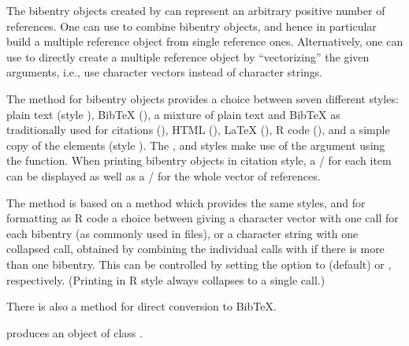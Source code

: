 \begin{Details}\relax
The bibentry objects created by  can represent an
arbitrary positive number of references.  One can use  to
combine bibentry objects, and hence in particular build a multiple
reference object from single reference ones.  Alternatively, one can
use  to directly create a multiple reference object by
``vectorizing'' the given arguments, i.e., use character vectors
instead of character strings.

The  method for bibentry objects provides a choice
between seven different styles:
plain text (style ),
BibTeX (),
a mixture of plain text and BibTeX as traditionally used for citations
(),
HTML (),
LaTeX (),
R code (),
and a simple copy of the  elements (style
).
The ,  and  styles make use
of the  argument using the 
function.  When printing bibentry objects in citation style, a
/ for each item can be displayed as well as
a / for the whole vector of references.

The  method is based on a 
method which provides the same styles, and for formatting as R code
a choice between giving a character vector with one 
call for each bibentry (as commonly used in  files), or
a character string with one collapsed call, obtained by combining the
individual calls with  if there is more than one bibentry.
This can be controlled by setting the option  to
 (default) or , respectively.  (Printing in R
style always collapses to a single call.)

There is also a  method for direct conversion to
BibTeX.
\end{Details}
%
\begin{Value}
 produces an object of class .
\end{Value}
%
